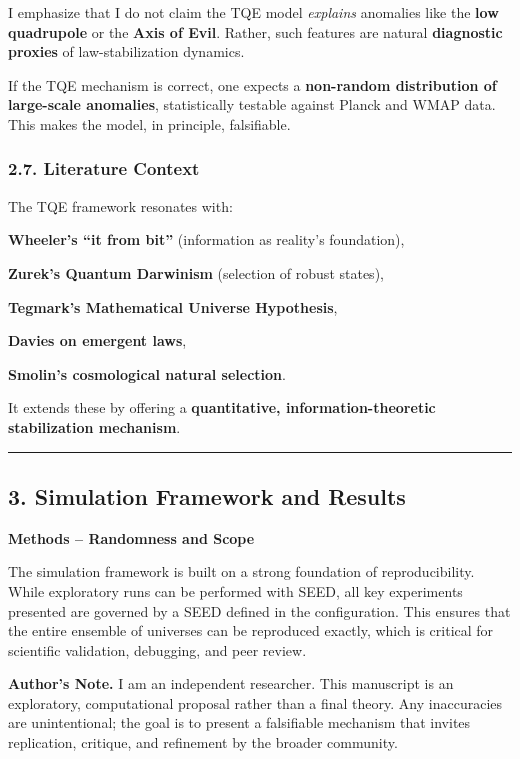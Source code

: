 I emphasize that I do not claim the TQE model \emph{explains} anomalies
like the \textbf{low quadrupole} or the \textbf{Axis of Evil}. Rather,
such features are natural \textbf{diagnostic proxies} of
law-stabilization dynamics.

If the TQE mechanism is correct, one expects a \textbf{non-random
distribution of large-scale anomalies}, statistically testable against
Planck and WMAP data. This makes the model, in principle, falsifiable.

\subsubsection{\texorpdfstring{\textbf{2.7. Literature
Context}}{2.7. Literature Context}}\label{literature-context}

The TQE framework resonates with:

\textbf{Wheeler's ``it from bit''} (information as reality's
foundation),

\textbf{Zurek's Quantum Darwinism} (selection of robust states),

\textbf{Tegmark's Mathematical Universe Hypothesis},

\textbf{Davies on emergent laws},

\textbf{Smolin's cosmological natural selection}.

It extends these by offering a \textbf{quantitative,
information-theoretic stabilization mechanism}.

\begin{center}\rule{0.5\linewidth}{0.5pt}\end{center}

\subsection{\texorpdfstring{\textbf{3. Simulation Framework and
Results}}{3. Simulation Framework and Results}}\label{simulation-framework-and-results}

\textbf{Methods -- Randomness and Scope}

The simulation framework is built on a strong foundation of
reproducibility. While exploratory runs can be performed with SEED, all
key experiments presented are governed by a SEED defined in the
configuration. This ensures that the entire ensemble of universes can be
reproduced exactly, which is critical for scientific validation,
debugging, and peer review.

\textbf{Author's Note.} I am an independent researcher. This manuscript
is an exploratory, computational proposal rather than a final theory.
Any inaccuracies are unintentional; the goal is to present a falsifiable
mechanism that invites replication, critique, and refinement by the
broader community.

